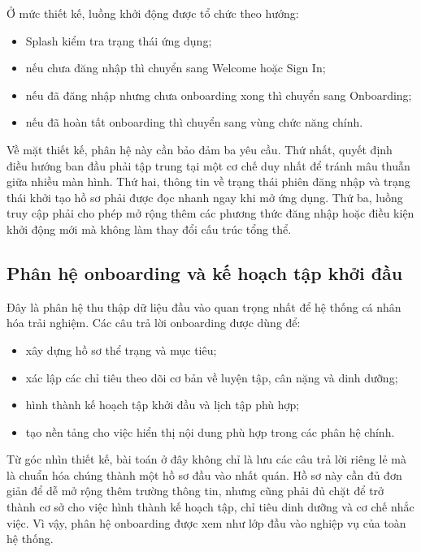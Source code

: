 Ở mức thiết kế, luồng khởi động được tổ chức theo hướng:

\begin{itemize}
    \item Splash kiểm tra trạng thái ứng dụng;
    \item nếu chưa đăng nhập thì chuyển sang Welcome hoặc Sign In;
    \item nếu đã đăng nhập nhưng chưa onboarding xong thì chuyển sang Onboarding;
    \item nếu đã hoàn tất onboarding thì chuyển sang vùng chức năng chính.
\end{itemize}

Về mặt thiết kế, phân hệ này cần bảo đảm ba yêu cầu. Thứ nhất, quyết định điều hướng ban đầu phải tập trung tại một cơ chế duy nhất để tránh mâu thuẫn giữa nhiều màn hình. Thứ hai, thông tin về trạng thái phiên đăng nhập và trạng thái khởi tạo hồ sơ phải được đọc nhanh ngay khi mở ứng dụng. Thứ ba, luồng truy cập phải cho phép mở rộng thêm các phương thức đăng nhập hoặc điều kiện khởi động mới mà không làm thay đổi cấu trúc tổng thể.

\subsection{Phân hệ onboarding và kế hoạch tập khởi đầu}

Đây là phân hệ thu thập dữ liệu đầu vào quan trọng nhất để hệ thống cá nhân hóa trải nghiệm. Các câu trả lời onboarding được dùng để:

\begin{itemize}
    \item xây dựng hồ sơ thể trạng và mục tiêu;
    \item xác lập các chỉ tiêu theo dõi cơ bản về luyện tập, cân nặng và dinh dưỡng;
    \item hình thành kế hoạch tập khởi đầu và lịch tập phù hợp;
    \item tạo nền tảng cho việc hiển thị nội dung phù hợp trong các phân hệ chính.
\end{itemize}

Từ góc nhìn thiết kế, bài toán ở đây không chỉ là lưu các câu trả lời riêng lẻ mà là chuẩn hóa chúng thành một hồ sơ đầu vào nhất quán. Hồ sơ này cần đủ đơn giản để dễ mở rộng thêm trường thông tin, nhưng cũng phải đủ chặt để trở thành cơ sở cho việc hình thành kế hoạch tập, chỉ tiêu dinh dưỡng và cơ chế nhắc việc. Vì vậy, phân hệ onboarding được xem như lớp đầu vào nghiệp vụ của toàn hệ thống.

